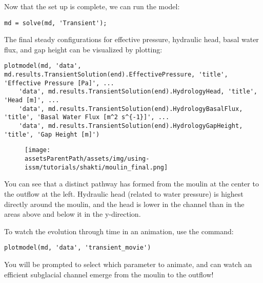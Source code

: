 Now that the set up is complete, we can run the model:
\begin{lstlisting}
md = solve(md, 'Transient');
\end{lstlisting}

The final steady configurations for effective pressure, hydraulic head, basal water flux, and gap height can be visualized by plotting:
\begin{lstlisting}
plotmodel(md, 'data', md.results.TransientSolution(end).EffectivePressure, 'title', 'Effective Pressure [Pa]', ...
	'data', md.results.TransientSolution(end).HydrologyHead, 'title', 'Head [m]', ...
	'data', md.results.TransientSolution(end).HydrologyBasalFlux, 'title', 'Basal Water Flux [m^2 s^{-1}]', ...
	'data', md.results.TransientSolution(end).HydrologyGapHeight, 'title', 'Gap Height [m]')
\end{lstlisting}

\begin{figure}[H]
	\begin{center}
		\texttt{[image: \\assetsParentPath/assets/img/using-issm/tutorials/shakti/moulin\_final.png]}
	\end{center}
\end{figure}

You can see that a distinct pathway has formed from the moulin at the center to the outflow at the left. Hydraulic head (related to water pressure) is highest directly around the moulin, and the head is lower in the channel than in the areas above and below it in the y-direction.

To watch the evolution through time in an animation, use the command:
\begin{lstlisting}
plotmodel(md, 'data', 'transient_movie')
\end{lstlisting}

You will be prompted to select which parameter to animate, and can watch an efficient subglacial channel emerge from the moulin to the outflow!

\clearpage %
